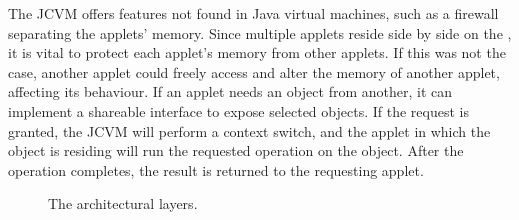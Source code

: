 The JCVM offers features not found in Java virtual machines, such as a firewall separating the applets' memory. Since multiple applets reside side by side on the \jc, it is vital to protect each applet's memory from other applets. If this was not the case, another applet could freely access and alter the memory of another applet, affecting its behaviour. If an applet needs an object from another, it can implement a shareable interface to expose selected objects. If the request is granted, the JCVM will perform a context switch, and the applet in which the object is residing will run the requested operation on the object. After the operation completes, the result is returned to the requesting applet.

\begin{figure}[H]
\centering

\caption{The \jc architectural layers.}
\label{fig:architecture}
\end{figure}
